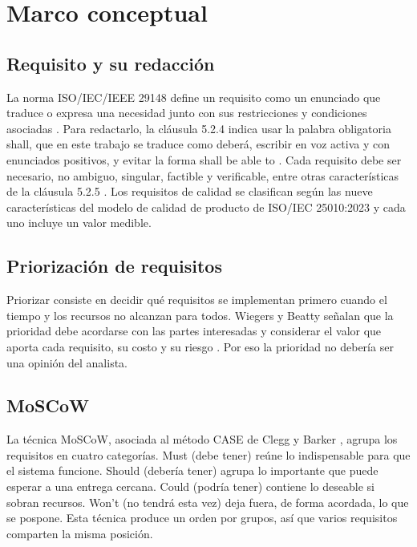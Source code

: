 \section{Marco conceptual}

\subsection{Requisito y su redacción}

La norma ISO/IEC/IEEE 29148 define un requisito como un enunciado que traduce o expresa una necesidad junto con sus restricciones y condiciones asociadas \cite[\nopp cl.~3.1.19]{ieee29148}. Para redactarlo, la cláusula 5.2.4 indica usar la palabra obligatoria shall, que en este trabajo se traduce como deberá, escribir en voz activa y con enunciados positivos, y evitar la forma shall be able to \cite[\nopp cl.~5.2.4]{ieee29148}. Cada requisito debe ser necesario, no ambiguo, singular, factible y verificable, entre otras características de la cláusula 5.2.5 \cite[\nopp cl.~5.2.5]{ieee29148}. Los requisitos de calidad se clasifican según las nueve características del modelo de calidad de producto de ISO/IEC 25010:2023 \cite{iso25010} y cada uno incluye un valor medible.

\subsection{Priorización de requisitos}

Priorizar consiste en decidir qué requisitos se implementan primero cuando el tiempo y los recursos no alcanzan para todos. Wiegers y Beatty señalan que la prioridad debe acordarse con las partes interesadas y considerar el valor que aporta cada requisito, su costo y su riesgo \cite[\nopp cap.~16]{wiegers2013}. Por eso la prioridad no debería ser una opinión del analista.

\subsection{MoSCoW}

La técnica MoSCoW, asociada al método CASE de Clegg y Barker \cite{clegg1994}, agrupa los requisitos en cuatro categorías. Must (debe tener) reúne lo indispensable para que el sistema funcione. Should (debería tener) agrupa lo importante que puede esperar a una entrega cercana. Could (podría tener) contiene lo deseable si sobran recursos. Won't (no tendrá esta vez) deja fuera, de forma acordada, lo que se pospone. Esta técnica produce un orden por grupos, así que varios requisitos comparten la misma posición.


